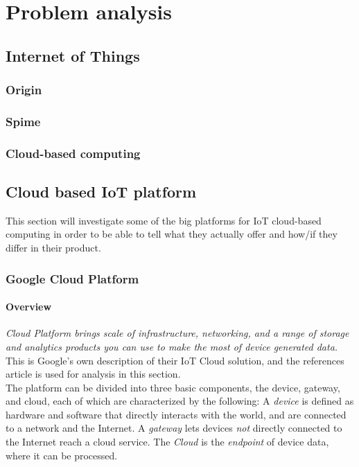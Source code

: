 \section{Problem analysis}
\subsection{Internet of Things}
\subsubsection{Origin}

\subsubsection{Spime}

\subsubsection{Cloud-based computing}

\subsection{Cloud based IoT platform}
This section will investigate some of the big platforms for IoT cloud-based computing in order to be able to tell what they actually offer and how/if they differ in their product. 

\subsubsection{Google Cloud Platform}
\paragraph{Overview} 
\textit{Cloud Platform brings scale of infrastructure, networking, and a range of storage and analytics products you can use to make the most of device generated data.}\cite{website:gcp}
This is Google's own description of their IoT Cloud solution, and the references article is used for analysis in this section. \\

The platform can be divided into three basic components, the device, gateway, and cloud, each of which are characterized by the following: A \textit{device} is defined as hardware and software that directly interacts with the world, and are connected to a network and the Internet. A \textit{gateway} lets devices \textit{not} directly connected to the Internet reach a cloud service. The \textit{Cloud} is the \textit{endpoint} of device data, where it can be processed.\\

